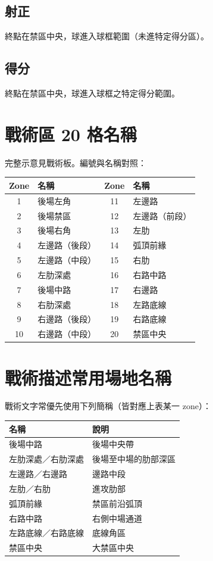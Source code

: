 \documentclass[11pt]{article}
\newcommand{\term}[1]{\textbf{#1}}
\begin{document}
\subsection*{\term{射正}}
終點在禁區中央，球進入球框範圍（未進特定得分區）。

\subsection*{\term{得分}}
終點在禁區中央，球進入球框之特定得分範圍。

\section{戰術區 20 格名稱}

完整示意見戰術板。編號與名稱對照：

\vspace{0.3em}
\small
\begin{tabular}{@{}clcl@{}}
\toprule
\textbf{Zone} & \textbf{名稱} & \textbf{Zone} & \textbf{名稱} \\
\midrule
1 & 後場左角 & 11 & 左邊路 \\
2 & 後場禁區 & 12 & 左邊路（前段） \\
3 & 後場右角 & 13 & 左肋 \\
4 & 左邊路（後段） & 14 & 弧頂前緣 \\
5 & 左邊路（中段） & 15 & 右肋 \\
6 & 左肋深處 & 16 & 右路中路 \\
7 & 後場中路 & 17 & 右邊路 \\
8 & 右肋深處 & 18 & 左路底線 \\
9 & 右邊路（後段） & 19 & 右路底線 \\
10 & 右邊路（中段） & 20 & 禁區中央 \\
\bottomrule
\end{tabular}
\normalsize

\section{戰術描述常用場地名稱}

戰術文字常優先使用下列簡稱（皆對應上表某一 zone）：

\vspace{0.4em}
\begin{tabular}{@{}ll@{}}
\toprule
\textbf{名稱} & \textbf{說明} \\
\midrule
後場中路 & 後場中央帶 \\
左肋深處／右肋深處 & 後場至中場的肋部深區 \\
左邊路／右邊路 & 邊路中段 \\
左肋／右肋 & 進攻肋部 \\
弧頂前緣 & 禁區前沿弧頂 \\
右路中路 & 右側中場通道 \\
左路底線／右路底線 & 底線角區 \\
禁區中央 & 大禁區中央 \\
\bottomrule
\end{tabular}
\end{document}
